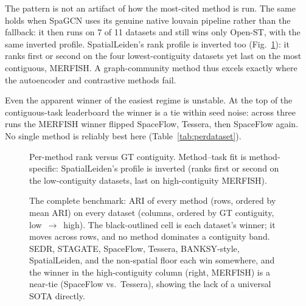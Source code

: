 \documentclass[journal]{IEEEtran}
\begin{document}
The pattern is not an artifact of how the most-cited method is run. The same holds when SpaGCN uses its
genuine native louvain pipeline rather than the fallback: it then runs on 7 of 11 datasets and still wins
only Open-ST, with the same inverted profile. SpatialLeiden's rank profile is inverted too
(Fig.~\ref{fig:profile}): it ranks first or second on the four lowest-contiguity datasets yet last on the
most contiguous, MERFISH. A graph-community method thus excels exactly where the autoencoder and
contrastive methods fail.

Even the apparent winner of the easiest regime is unstable. At the top of the contiguous-task leaderboard
the winner is a tie within seed noise: across three runs the MERFISH winner flipped SpaceFlow, Tessera,
then SpaceFlow again. No single method is reliably best here (Table~\ref{tab:perdataset}).

\begin{table}[!t]\centering\small
\caption{Per-dataset best-config results (core panel of six methods plus two floors, 3 seeds), ordered by
GT contiguity. The winner differs across datasets (seven distinct winners, one of them a floor), the
spatial-prior advantage tracks contiguity, and the candidate method's rank does not. Winner ARI is the
winner's best-config mean.}
\label{tab:perdataset}

\end{table}

\begin{figure}[!t]\centering
\resizebox{0.95\linewidth}{!}{}
\caption{Per-method rank versus GT contiguity. Method--task fit is method-specific: SpatialLeiden's profile
is inverted (ranks first or second on the low-contiguity datasets, last on high-contiguity MERFISH).}
\label{fig:profile}
\end{figure}

\begin{figure}[!t]\centering
\resizebox{\linewidth}{!}{}
\caption{The complete benchmark: ARI of every method (rows, ordered by mean ARI) on every dataset
(columns, ordered by GT contiguity, low~$\rightarrow$~high). The black-outlined cell is each dataset's
winner; it moves across rows, and no method dominates a contiguity band. SEDR, STAGATE, SpaceFlow, Tessera,
BANKSY-style, SpatialLeiden, and the non-spatial floor each win somewhere, and the winner in the high-contiguity column
(right, MERFISH) is a near-tie (SpaceFlow vs.\ Tessera), showing the lack of a universal SOTA directly.}
\label{fig:heatmap}
\end{figure}
\end{document}
